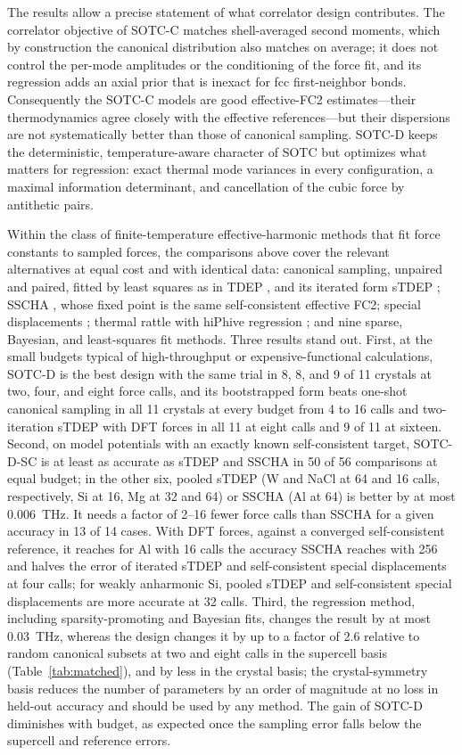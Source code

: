 \documentclass[aip,jap,reprint,amsmath,amssymb,floatfix]{revtex4-2}
\begin{document}
The results allow a precise statement of what correlator design contributes.
The correlator objective of SOTC-C matches shell-averaged second moments,
which by construction the canonical distribution also matches on average; it
does not control the per-mode amplitudes or the conditioning of the force fit,
and its regression adds an axial prior that is inexact for fcc first-neighbor
bonds. Consequently the SOTC-C models are good effective-FC2
estimates---their thermodynamics agree closely with the effective
references---but their dispersions are not systematically better than those
of canonical sampling. SOTC-D keeps the deterministic, temperature-aware
character of SOTC but optimizes what matters for regression: exact thermal
mode variances in every configuration, a maximal information determinant, and
cancellation of the cubic force by antithetic pairs.

Within the class of finite-temperature effective-harmonic methods that fit
force constants to sampled forces, the comparisons above cover the relevant
alternatives at equal cost and with identical data: canonical sampling,
unpaired and paired, fitted by least squares as in TDEP \cite{ref5,ref6},
and its iterated form sTDEP \cite{ref60}; SSCHA \cite{ref7,ref50}, whose fixed point is the same
self-consistent effective FC2; special displacements \cite{ref42}; thermal
rattle with hiPhive regression \cite{ref59}; and nine sparse, Bayesian, and
least-squares fit methods. Three results stand out. First, at the small
budgets typical of high-throughput or expensive-functional calculations,
SOTC-D is the best design with the same trial in 8, 8, and 9 of 11 crystals
at two, four, and eight force calls, and its bootstrapped form beats
one-shot canonical sampling in all 11 crystals at every budget from 4 to 16
calls and two-iteration sTDEP with DFT forces in all 11 at eight calls and
9 of 11 at sixteen. Second, on model potentials with an exactly known
self-consistent target, SOTC-D-SC is at least as accurate as sTDEP and SSCHA
in 50 of 56 comparisons at equal budget; in the other six, pooled sTDEP (W
and NaCl at 64 and 16 calls, respectively, Si at 16, Mg at 32 and 64) or SSCHA (Al at 64)
is better by at most 0.006~THz. It needs a factor of 2--16 fewer force calls
than SSCHA for a given accuracy in 13 of 14 cases. With DFT forces, against
a converged self-consistent reference, it reaches for Al with 16 calls the
accuracy SSCHA reaches with 256 and halves the error of iterated sTDEP and
self-consistent special displacements at four calls; for weakly anharmonic
Si, pooled sTDEP and self-consistent special displacements are more accurate
at 32 calls. Third, the regression method, including sparsity-promoting
and Bayesian fits, changes the result by at most 0.03~THz, whereas the
design changes it by up to a factor of 2.6 relative to random canonical
subsets at two and eight calls in the supercell basis
(Table~\ref{tab:matched}), and by less in the crystal basis; the crystal-symmetry basis
reduces the number of parameters by an order of magnitude at no loss in
held-out accuracy and should be used by any method. The gain of SOTC-D
diminishes with budget, as expected once the sampling error falls below the
supercell and reference errors.
\end{document}
